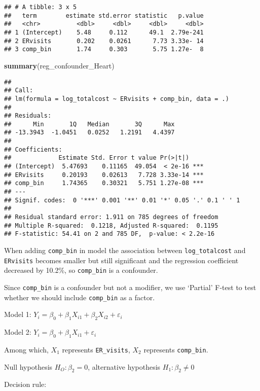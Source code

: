 \documentclass[]{article}
\newenvironment{Shaded}{\begin{snugshade}}{\end{snugshade}}
\newcommand{\KeywordTok}[1]{\textcolor[rgb]{0.13,0.29,0.53}{\textbf{#1}}}
\newcommand{\NormalTok}[1]{#1}
\begin{document}
\begin{verbatim}
## # A tibble: 3 x 5
##   term        estimate std.error statistic   p.value
##   <chr>          <dbl>     <dbl>     <dbl>     <dbl>
## 1 (Intercept)    5.48     0.112      49.1  2.79e-241
## 2 ERvisits       0.202    0.0261      7.73 3.33e- 14
## 3 comp_bin       1.74     0.303       5.75 1.27e-  8
\end{verbatim}

\begin{Shaded}
\begin{Highlighting}[]
\KeywordTok{summary}\NormalTok{(reg_confounder_Heart)}
\end{Highlighting}
\end{Shaded}

\begin{verbatim}
## 
## Call:
## lm(formula = log_totalcost ~ ERvisits + comp_bin, data = .)
## 
## Residuals:
##      Min       1Q   Median       3Q      Max 
## -13.3943  -1.0451   0.0252   1.2191   4.4397 
## 
## Coefficients:
##             Estimate Std. Error t value Pr(>|t|)    
## (Intercept)  5.47693    0.11165  49.054  < 2e-16 ***
## ERvisits     0.20193    0.02613   7.728 3.33e-14 ***
## comp_bin     1.74365    0.30321   5.751 1.27e-08 ***
## ---
## Signif. codes:  0 '***' 0.001 '**' 0.01 '*' 0.05 '.' 0.1 ' ' 1
## 
## Residual standard error: 1.911 on 785 degrees of freedom
## Multiple R-squared:  0.1218, Adjusted R-squared:  0.1195 
## F-statistic: 54.41 on 2 and 785 DF,  p-value: < 2.2e-16
\end{verbatim}

When adding \texttt{comp\_bin} in model the association between
\texttt{log\_totalcost} and \texttt{ERvisits} becomes smaller but still
significant and the regression coefficient decreased by 10.2\%, so
\texttt{comp\_bin} is a confounder.

Since \texttt{comp\_bin} is a confounder but not a modifier, we use
`Partial' F-test to test whether we should include \texttt{comp\_bin} as
a factor.

Model 1:
\(Y_i = \beta_0 + \beta_1X_{i1} + \beta_2X_{i2} + \varepsilon_i\)

Model 2: \(Y_i = \beta_0 + \beta_1X_{i1} + \varepsilon_i\)

Among which, \(X_1\) represents \texttt{ER\_visits}, \(X_2\) represents
\texttt{comp\_bin}.

Null hypothesis \(H_O: \beta_2 = 0\), alternative hypothesis
\(H_1: \beta_2 \neq 0\)

Decision rule:
\end{document}
